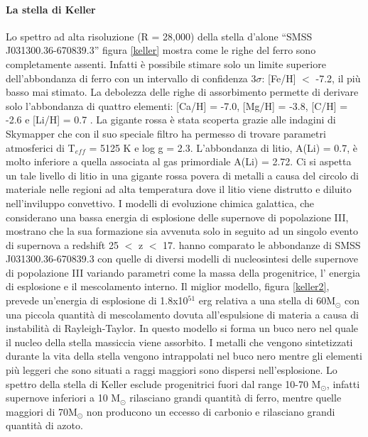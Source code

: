 \documentclass[12pt]{article}
\begin{document}
\paragraph{La stella di Keller}
Lo spettro ad alta risoluzione (R = 28,000)  della stella d’alone “SMSS J031300.36-670839.3” figura \ref{keller}  mostra come le righe del ferro sono completamente assenti. Infatti è possibile stimare solo un limite superiore dell’abbondanza di ferro con un intervallo di confidenza 3$\sigma$: [Fe/H] $<$  -7.2, il più basso mai stimato. La debolezza delle righe di assorbimento permette di derivare solo l’abbondanza di quattro elementi: [Ca/H] = -7.0, [Mg/H] = -3.8, [C/H] = -2.6 e [Li/H] = 0.7 . La gigante rossa è stata scoperta grazie alle indagini di Skymapper che con il suo speciale filtro ha permesso di trovare parametri atmosferici di T$_{eff}$ = 5125 K e log g = 2.3. 
L’abbondanza di litio, A(Li) = 0.7, è molto inferiore a quella associata al gas primordiale A(Li) = 2.72. Ci si aspetta un tale livello di litio in una gigante rossa povera di metalli a causa del circolo di materiale nelle regioni ad alta temperatura dove il litio viene distrutto e diluito nell’inviluppo convettivo.
I modelli di evoluzione chimica galattica, che considerano una bassa energia di esplosione delle supernove di popolazione III, mostrano che la sua formazione sia avvenuta solo in seguito ad un singolo evento di supernova a redshift 25 $<$ z $<$ 17. \cite{keller} hanno comparato le abbondanze di SMSS J031300.36-670839.3 con quelle di diversi modelli di nucleosintesi delle supernove di popolazione III variando parametri come la massa della progenitrice, l’ energia di esplosione e il mescolamento interno. Il miglior modello, figura \ref{keller2}, prevede un’energia di esplosione di 1.8x10$^{51}$ erg relativa a una stella di 60M$_{\odot}$ con una piccola quantità di mescolamento dovuta all’espulsione di materia a causa di instabilità di Rayleigh-Taylor. 
In questo modello si forma un buco nero nel quale il nucleo della stella massiccia viene assorbito. I metalli che vengono sintetizzati durante la vita della stella vengono intrappolati nel buco nero mentre gli elementi più leggeri che sono situati a raggi maggiori sono dispersi nell’esplosione. 
Lo spettro della stella di Keller esclude progenitrici fuori dal range 10-70 M$_{\odot}$, infatti supernove inferiori a 10 M$_{\odot}$ rilasciano grandi quantità di ferro, mentre quelle maggiori di 70M$_{\odot}$ non producono un eccesso di carbonio e rilasciano grandi quantità di azoto. 
\end{document}

